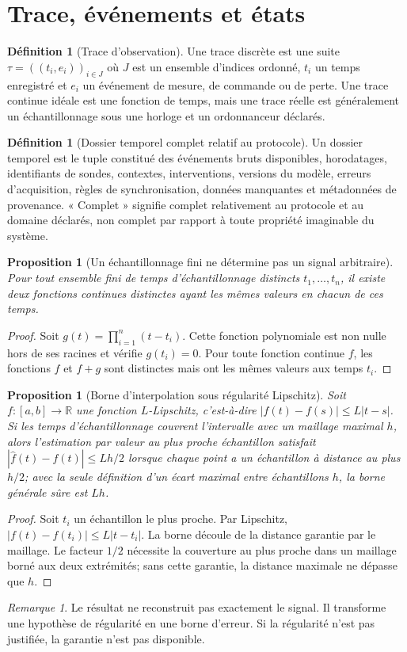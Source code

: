 \documentclass[11pt,oneside]{book}
\newtheorem{proposition}[theoreme]{Proposition}
\theoremstyle{definition}
\newtheorem{definition}[theoreme]{Définition}
\theoremstyle{remark}
\newtheorem{remarque}[theoreme]{Remarque}
\newcommand{\R}{\mathbb R}
\newcommand{\1}{\mathbf 1}
\newcommand{\abs}[1]{\left\lvert #1\right\rvert}
\begin{document}
\section{Trace, événements et états}
\begin{definition}[Trace d'observation]
Une trace discrète est une suite \(\tau=((t_i,e_i))_{i\in J}\) où \(J\) est un ensemble d'indices ordonné, \(t_i\) un temps enregistré et \(e_i\) un événement de mesure, de commande ou de perte. Une trace continue idéale est une fonction de temps, mais une trace réelle est généralement un échantillonnage sous une horloge et un ordonnanceur déclarés.
\end{definition}
\begin{definition}[Dossier temporel complet relatif au protocole]
Un dossier temporel est le tuple constitué des événements bruts disponibles, horodatages, identifiants de sondes, contextes, interventions, versions du modèle, erreurs d'acquisition, règles de synchronisation, données manquantes et métadonnées de provenance. « Complet » signifie complet relativement au protocole et au domaine déclarés, non complet par rapport à toute propriété imaginable du système.
\end{definition}
\begin{proposition}[Un échantillonnage fini ne détermine pas un signal arbitraire]
Pour tout ensemble fini de temps d'échantillonnage distincts \(t_1,\ldots,t_n\), il existe deux fonctions continues distinctes ayant les mêmes valeurs en chacun de ces temps.
\end{proposition}
\begin{proof}
Soit \(g(t)=\prod_{i=1}^n(t-t_i)\). Cette fonction polynomiale est non nulle hors de ses racines et vérifie \(g(t_i)=0\). Pour toute fonction continue \(f\), les fonctions \(f\) et \(f+g\) sont distinctes mais ont les mêmes valeurs aux temps \(t_i\).\end{proof}
\begin{proposition}[Borne d'interpolation sous régularité Lipschitz]
Soit \(f:[a,b]\to\R\) une fonction \(L\)-Lipschitz, c'est-à-dire \(\abs{f(t)-f(s)}\le L\abs{t-s}\). Si les temps d'échantillonnage couvrent l'intervalle avec un maillage maximal \(h\), alors l'estimation par valeur au plus proche échantillon satisfait \(\abs{\hat f(t)-f(t)}\le Lh/2\) lorsque chaque point a un échantillon à distance au plus \(h/2\); avec la seule définition d'un écart maximal entre échantillons \(h\), la borne générale sûre est \(Lh\).
\end{proposition}
\begin{proof}
Soit \(t_i\) un échantillon le plus proche. Par Lipschitz, \(\abs{f(t)-f(t_i)}\le L\abs{t-t_i}\). La borne découle de la distance garantie par le maillage. Le facteur \(1/2\) nécessite la couverture au plus proche dans un maillage borné aux deux extrémités; sans cette garantie, la distance maximale ne dépasse que \(h\).\end{proof}
\begin{remarque}
Le résultat ne reconstruit pas exactement le signal. Il transforme une hypothèse de régularité en une borne d'erreur. Si la régularité n'est pas justifiée, la garantie n'est pas disponible.
\end{remarque}
\end{document}
